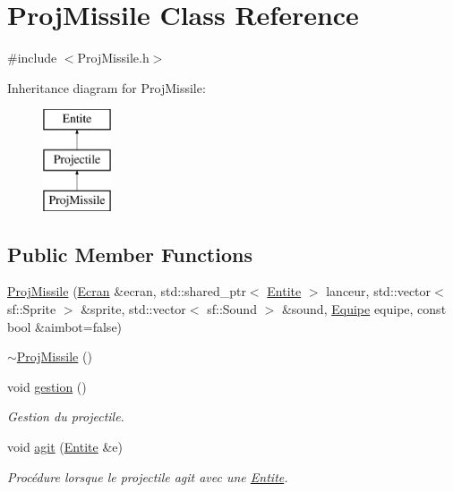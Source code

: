 \hypertarget{class_proj_missile}{}\section{Proj\+Missile Class Reference}
\label{class_proj_missile}


{\ttfamily \#include $<$Proj\+Missile.\+h$>$}

Inheritance diagram for Proj\+Missile\+:\begin{figure}[H]
\begin{center}
\leavevmode
\includegraphics[height=3.000000cm]{class_proj_missile}
\end{center}
\end{figure}
\subsection*{Public Member Functions}
\begin{DoxyCompactItemize}
\item 
\mbox{\hyperlink{class_proj_missile_aa7eb20457df3b5c051cd607c9f92ae67}{Proj\+Missile}} (\mbox{\hyperlink{class_ecran}{Ecran}} \&ecran, std\+::shared\+\_\+ptr$<$ \mbox{\hyperlink{class_entite}{Entite}} $>$ lanceur, std\+::vector$<$ sf\+::\+Sprite $>$ \&sprite, std\+::vector$<$ sf\+::\+Sound $>$ \&sound, \mbox{\hyperlink{constantes_8h_a08fa5554288d5031a8f3bb83cc04ee83}{Equipe}} equipe, const bool \&aimbot=false)
\item 
\mbox{\hyperlink{class_proj_missile_adf1e62cc1a0c195b6de72ca7830338c5}{$\sim$\+Proj\+Missile}} ()
\item 
void \mbox{\hyperlink{class_proj_missile_a90bee0454d77d2846431f2c8704e2d11}{gestion}} ()
\begin{DoxyCompactList}\small\item\em Gestion du projectile. \end{DoxyCompactList}\item 
void \mbox{\hyperlink{class_proj_missile_a8125c442857f7a0fc2d0ff442c39aca7}{agit}} (\mbox{\hyperlink{class_entite}{Entite}} \&e)
\begin{DoxyCompactList}\small\item\em Procédure lorsque le projectile agit avec une \mbox{\hyperlink{class_entite}{Entite}}. \end{DoxyCompactList}\end{DoxyCompactItemize}
